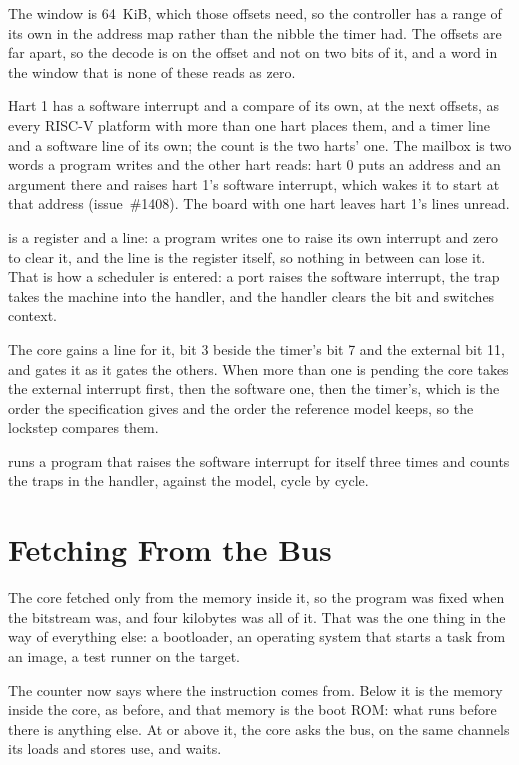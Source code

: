 \documentclass[journal,onecolumn,9pt]{IEEEtran}
\begin{document}
The window is 64~KiB, which those offsets need, so the controller has
a range of its own in the address map rather than the nibble the timer
had. The offsets are far apart, so the decode is on the offset and not
on two bits of it, and a word in the window that is none of these
reads as zero.

Hart 1 has a software interrupt and a compare of its own, at the next
offsets, as every RISC-V platform with more than one hart places them,
and a timer line and a software line of its own; the count is the two
harts' one. The mailbox is two words a program writes and the other
hart reads: hart 0 puts an address and an argument there and raises
hart 1's software interrupt, which wakes it to start at that address
(issue~\#1408). The board with one hart leaves hart 1's lines unread.

 is a register and a line: a program writes one to raise
its own interrupt and zero to clear it, and the line is the register
itself, so nothing in between can lose it. That is how a scheduler is
entered: a port raises the software interrupt, the trap takes the
machine into the handler, and the handler clears the bit and switches
context.

The core gains a line for it,  bit 3 beside the timer's bit
7 and the external bit 11, and  gates it as it gates the
others. When more than one is pending the core takes the external
interrupt first, then the software one, then the timer's, which is the
order the specification gives and the order the reference model keeps,
so the lockstep compares them.

 runs a program that raises the
software interrupt for itself three times and counts the traps in the
handler, against the model, cycle by cycle.

\section{Fetching From the Bus}
\label{sec:v-fetch}

The core fetched only from the memory inside it, so the program was
fixed when the bitstream was, and four kilobytes was all of it. That
was the one thing in the way of everything else: a bootloader, an
operating system that starts a task from an image, a test runner on
the target.

The counter now says where the instruction comes from. Below
 it is the memory inside the core, as before, and
that memory is the boot ROM: what runs before there is anything else.
At or above it, the core asks the bus, on the same channels its loads
and stores use, and waits.
\end{document}
